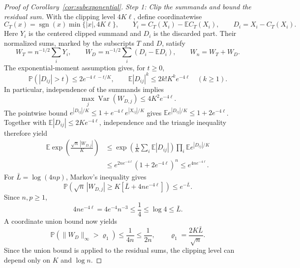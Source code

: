 \documentclass[11pt,letterpaper]{article}
\newif\ifshowrev
\newcommand{\rev}[1]{\ifshowrev{\color{revblue}%
\hypersetup{linkcolor=revblue,citecolor=revblue,urlcolor=revblue}#1}\else#1\fi}
\newcommand{\rs}[1]{\ifshowrev{\color{revblue}#1}\else#1\fi}
\newif\ifshowskill
\newcommand{\skl}[1]{\ifshowskill{\color{revblue}%
\hypersetup{linkcolor=revblue,citecolor=revblue,urlcolor=revblue}#1}\else#1\fi}
\newcommand{\sks}[1]{\ifshowskill{\color{revblue}#1}\else#1\fi}
\newif\ifshowintro
\newcommand{\itx}[1]{\ifshowintro{\color{revblue}%
\hypersetup{linkcolor=revblue,citecolor=revblue,urlcolor=revblue}#1}\else#1\fi}
\theoremstyle{remark}
\newcommand{\E}{\mathbb E}
\newcommand{\Pp}{\mathbb P}
\newcommand{\Var}{\operatorname{Var}}
\begin{document}
\begin{proof}[Proof of Corollary~\ref{cor:subexponential}]
\emph{Step 1: Clip the \rs{summands} and bound the residual sum.}
\skl{With the clipping level \(4K\ell\),} define coordinatewise
\[
 C_T(x)=\operatorname{sgn}(x)\min\{|x|,\sks{4K\ell}\},\qquad
 Y_i=C_T(X_i)-\E C_T(X_i),\qquad \sks{D}_i=X_i-C_T(X_i).
\]
Here \(Y_i\) is the centered clipped \rs{summand} and \(\sks{D}_i\) is the discarded
part. Their normalized sums\skl{, marked by the subscripts \(T\) and \(D\),} satisfy
\[
 W_T=n^{-1/2}\sum_iY_i,\qquad
 \sks{W_D}=n^{-1/2}\sum_i(\sks{D}_i-\E \sks{D}_i),\qquad W_n=W_T+\sks{W_D}.
\]
The exponential-moment assumption gives, for \(t\ge0\),
\[
 \Pp(|\sks{D}_{ij}|>t)\le2e^{-\sks{4\ell}-t/K},\qquad
 \E|\sks{D}_{ij}|^k\le2k!K^ke^{-\sks{4\ell}}\quad(k\ge1).
\]
In particular, independence of the \rs{summands} implies
\begin{equation}
 \max_j\Var(\sks{W_{D,j}})\le4K^2e^{-\sks{4\ell}}.
 \label{tail:residual-moments}
\end{equation}
The pointwise bound \(e^{|\sks{D}_{ij}|/K}\le1+e^{-\sks{4\ell}}e^{|X_{ij}|/K}\)
gives \(\E e^{|\sks{D}_{ij}|/K}\le1+2e^{-\sks{4\ell}}\). Together with
\(\E|\sks{D}_{ij}|\le2Ke^{-\sks{4\ell}}\), independence and the triangle inequality
therefore yield
\begin{align*}
 \E\exp\!\left(\frac{\sqrt n\,|\sks{W_{D,j}}|}{K}\right)
 &\le\exp\!\left(\frac1K\sum_i\E|\sks{D}_{ij}|\right)
          \prod_i\E e^{|\sks{D}_{ij}|/K}\\
 &\le e^{2ne^{-\sks{4\ell}}}(1+2e^{-\sks{4\ell}})^n
 \le e^{4ne^{-\sks{4\ell}}}.
\end{align*}
For \(\sks{\bar L}=\log(4np)\), Markov's inequality gives
\[
 \Pp\!\left(\sqrt n\,|\sks{W_{D,j}}|\ge K[\sks{\bar L}+4ne^{-\sks{4\ell}}]\right)\le e^{-\sks{\bar L}}.
\]
Since \(n,p\ge1\),
\[
 4ne^{-\sks{4\ell}}=4e^{-4}n^{-3}\le\frac14\le\log4\le \sks{\bar L}.
\]
A coordinate union bound now yields
\begin{equation}
 \Pp(\|\sks{W_D}\|_\infty>\sks{\varrho_1})\le\frac1{4n}\le\frac1{2n},\qquad
 \sks{\varrho_1}=\frac{2K\sks{\bar L}}{\sqrt n}.
 \label{tail:sum-coupling}
\end{equation}
\rev{Since the union bound is applied to the residual sums, the clipping
level can depend only on \itx{\(K\) and} \(\log n\).}


\end{proof}
\end{document}
